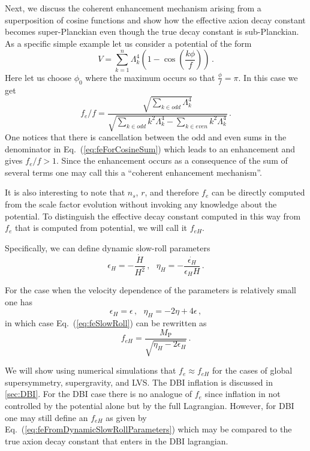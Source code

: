 \documentclass[12pt]{article}
\begin{document}
Next, we discuss the coherent enhancement mechanism arising from a superposition of cosine functions and show how the effective axion decay constant becomes super-Planckian even though the true decay constant is sub-Planckian.
As a specific simple example let us consider a potential of the form
\begin{equation} \label{eq:cosineSumPotential}
  V = \sum_{k = 1}^n \Lambda_k^4 \left(1 - \cos\left(\frac{k\phi}{f}\right)\right)\,.
\end{equation}
Here let us choose $\phi_0$ where the maximum occurs so that $\frac{\phi}{f} = \pi$.
In this case we get
\begin{equation} \label{eq:feForCosineSum}
  {f_e} / f = \frac
    {\sqrt{\sum_{k \in odd} \Lambda_k^4}}
    {\sqrt{\sum_{k \in odd} k^2 \Lambda_k^4 - \sum_{k \in even} k^2 \Lambda_k^4}}\,.
\end{equation}
One notices that there is cancellation between the odd and even sums in the denominator in Eq.~(\ref{eq:feForCosineSum}) which leads to an enhancement and gives $f_e / f > 1$.
Since the enhancement occurs as a consequence of the sum of several terms one may call this a ``coherent enhancement mechanism''.

It is also interesting to note that $n_s$, $r$, and therefore $f_e$ can be directly computed from the scale factor evolution without invoking any knowledge about the potential.
To distinguish the effective decay constant computed in this way from $f_e$ that is computed from potential, we will call it $f_{eH}$.

Specifically, we can define dynamic slow-roll parameters
\begin{equation} \label{eq:slowRollParametersDynamic}
  \epsilon_H = -\frac{\dot H}{H^2}\,,
  ~~~ \eta_H = -\frac{\dot{\epsilon_H}}{\epsilon_H H}\,.
\end{equation}

For the case when the velocity dependence of the parameters is relatively small one has
\begin{equation} \label{eq:slowRollParametersDynamicFromStatic}
  \epsilon_H = \epsilon\,,
  ~~~ \eta_H = -2 \eta + 4 \epsilon\,,
\end{equation}
in which case Eq.~(\ref{eq:feSlowRoll}) can be rewritten as
\begin{equation} \label{eq:feFromDynamicSlowRollParameters}
  f_{eH} = \frac{M_\text{P}}{\sqrt{\eta_H - 2 \epsilon_H}}\,.
\end{equation}

We will show using numerical simulations that $f_e \approx f_{eH}$ for the cases of global supersymmetry, supergravity, and LVS.
The DBI inflation is discussed in \ref{sec:DBI}.
For the DBI case there is no analogue of $f_e$ since inflation in not controlled by the potential alone but by the full Lagrangian.
However, for DBI one may still define an $f_{eH}$ as given by Eq.~(\ref{eq:feFromDynamicSlowRollParameters}) which may be compared to the true axion decay constant that enters in the DBI lagrangian.
\end{document}
